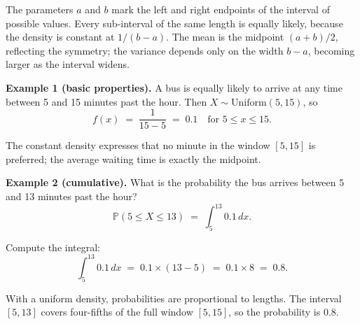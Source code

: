 \documentclass{book}
\begin{document}
The parameters $a$ and $b$ mark the left and right endpoints of the interval of possible values. Every sub-interval of the same length is equally likely, because the density is constant at $1/(b-a)$. The mean is the midpoint $(a+b)/2$, reflecting the symmetry; the variance depends only on the width $b-a$, becoming larger as the interval widens.

\medskip

\textbf{Example 1 (basic properties).} A bus is equally likely to arrive at any time between 5 and 15 minutes past the hour. Then $X \sim \mathrm{Uniform}(5,15)$, so
\begin{equation}
	f(x) \;=\; \frac{1}{15-5} \;=\; 0.1 \quad \text{for } 5 \le x \le 15.
\end{equation}

The constant density expresses that no minute in the window $[5,15]$ is preferred; the average waiting time is exactly the midpoint.

\medskip

\textbf{Example 2 (cumulative).} What is the probability the bus arrives between 5 and 13 minutes past the hour?
\begin{equation}
	\mathbb{P}(5 \le X \le 13) \;=\; \int_{5}^{13} 0.1 \, dx.
\end{equation}

Compute the integral:
\begin{equation}
	\int_{5}^{13} 0.1 \, dx \;=\; 0.1 \times (13-5) \;=\; 0.1 \times 8 \;=\; 0.8.
\end{equation}

With a uniform density, probabilities are proportional to lengths. The interval $[5,13]$ covers four-fifths of the full window $[5,15]$, so the probability is $0.8$.
\end{document}
